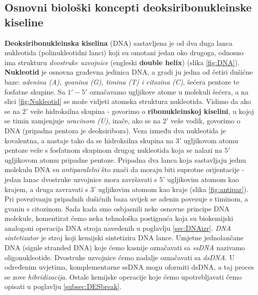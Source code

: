 \documentclass[a4paper,oneside,12pt]{memoir} %
\begin{document}
\begin{spacing}{1.5}
\section{Osnovni biološki koncepti deoksiribonukleinske kiseline}
\label{sec:DNA}
\textbf{Deoksiribonukleinska kiselina} (DNA) sastavljena je od dva duga lanca nukleotida (polinukleotidni lanci) koji su omotani jedan oko drugoga, odnosno ima strukturu \textit{dvostruke uzvojnice }(engleski \textbf{double helix}) (slika \ref{fig:DNA}). \textbf{Nukleotid} je osnovna građevna jedinica DNA, a gradi ju jedna od četiri dušićne baze: \textit{adenina (A), gvanina (G), timina (T) i citozina (C)}, šećera pentoze te fosfatne skupine. Sa $1' - 5'$ označavamo ugljikove atome u molekuli šećera, a na slici \ref{fig:Nukleotid} se može vidjeti atomska struktura nukleotida. Vidimo da ako se na $2'$ veže hidroksilna skupina - govorimo o \textbf{ribonukleinskoj kiselini}, u kojoj se timin zamjenjuje \textit{uracinom (U)}, inače, ako se na $2'$ veže vodik, govorimo o DNA (pripadna pentoza je deoksiriboza). Veza između dva nukleotida je kovalentna, a nastaje tako da se hidroksilna skupina na $3'$ ugljikovom atomu pentoze veže s fosfatnom skupinom drugog nukleotida koja se nalazi na $5'$ ugljikovom atomu pripadne pentoze. Pripadna dva lanca koja sastavljaju jednu molekulu DNA su \textit{antiparalelni} što znači da moraju biti suprotne orijentacije - jedan lanac dvostruke uzvojnice mora završavati s 5' ugljikovim atomom kao krajem, a druga zavravati s 3' ugljikovim atomom kao kraje (slika \ref{fig:antipar}). Pri povezivanju pripadnih dušićnih baza uvijek se adenin povezuje s timinom, a gvanin s citozinom. Sada kada smo osbjasnili neke osnovne principe DNA molekule, komentirat ćemo neka tehnološka postignuća koja su biokemijski analogoni operacija DNA stroja navedenih u poglavlju \ref{sec:DNAizr}.
\textit{DNA sintetizator} je stroj koji kemijski sintetizira DNA lance. Umjetne jednolančane DNA (signle stranded DNA) koje ćemo kasnije označavati sa \textit{ssDNA} nazivamo oligonukleotide. Dvostruke uzvojnice ćemo nadalje označavati sa \textit{dsDNA}. U određenim uvjetima, komplementarne ssDNA mogu oformiti dsDNA, a taj proces se zove \textit{hibridizacija}. Ostale kemijske operacije koje ćemo upotrebljavati ćemo opisati u poglavlju \ref{subsec:DESbreak}.


\end{spacing}
\end{document}

